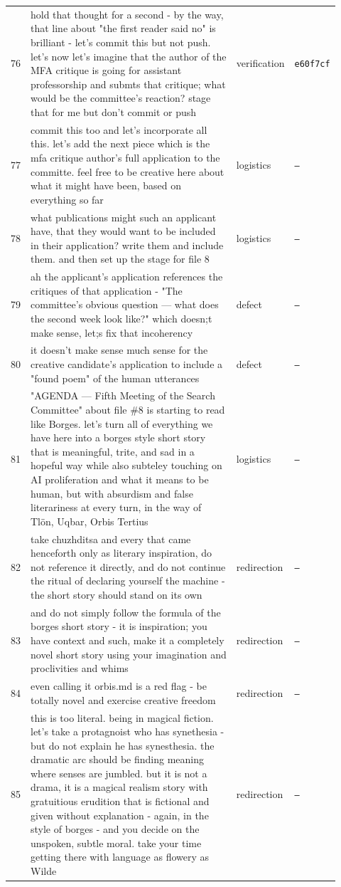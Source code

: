 \begin{longtable}{@{}p{0.04\linewidth}p{0.66\linewidth}p{0.13\linewidth}p{0.09\linewidth}@{}}
76 & hold that thought for a second - by the way, that line about "the first reader said no" is brilliant - let's commit this but not push. let's now let's imagine that the author of the MFA critique is going for assistant professorship and submts that critique; what would be the committee's reaction? stage that for me but don't commit or push & verification & \texttt{e60f7cf} \\
77 & commit this too and let's incorporate all this. let's add the next piece which is the mfa critique author's full application to the committe. feel free to be creative here about what it might have been, based on everything so far & logistics & \texttt{—} \\
78 & what publications might such an applicant have, that they would want to be included in their application? write them and include them. and then set up the stage for file 8 & logistics & \texttt{—} \\
79 & ah the applicant's application references the critiques of that application - "The committee's obvious question — what does the second week look like?" which doesn;t make sense, let;s fix that incoherency & defect & \texttt{—} \\
80 & it doesn't make sense much sense for the creative candidate's application to include a "found poem" of the human utterances & defect & \texttt{—} \\
81 & "AGENDA — Fifth Meeting of the Search Committee" about file \#8 is starting to read like Borges. let's turn all of everything we have here into a borges style short story that is meaningful, trite, and sad in a hopeful way while also subteley touching on AI proliferation and what it means to be human, but with absurdism and false literariness at every turn, in the way of Tlön, Uqbar, Orbis Tertius & logistics & \texttt{—} \\
82 & take chuzhditsa and every that came henceforth only as literary inspiration, do not reference it directly, and do not continue the ritual of declaring yourself the machine - the short story should stand on its own & redirection & \texttt{—} \\
83 & and do not simply follow the formula of the borges short story - it is inspiration; you have context and such, make it a completely novel short story using your imagination and proclivities and whims & redirection & \texttt{—} \\
84 & even calling it orbis.md is a red flag - be totally novel and exercise creative freedom & redirection & \texttt{—} \\
85 & this is too literal. being in magical fiction. let's take a protagnoist who has synethesia - but do not explain he has synesthesia. the dramatic arc should be finding meaning where senses are jumbled. but it is not a drama, it is a magical realism story with gratuitious erudition that is fictional and given without explanation - again, in the style of borges - and you decide on the unspoken, subtle moral. take your time getting there with language as flowery as Wilde & redirection & \texttt{—} \\
\bottomrule
\end{longtable}
